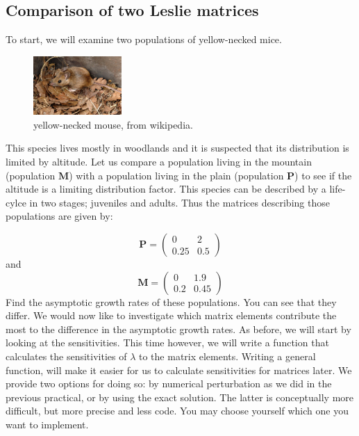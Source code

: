 \documentclass{article}\usepackage[]{graphicx}\usepackage[]{color}
\begin{document}
\subsection{Comparison of two Leslie matrices}
To start, we will examine two populations of yellow-necked mice. 

\begin{figure}[h]
\centering
\includegraphics[width=0.3\textwidth]{mouse.jpg}
\caption{\label{fig:mice}yellow-necked mouse, from wikipedia.}
\end{figure}

This species lives mostly in woodlands and it is suspected that its distribution is limited by altitude. Let us compare a population living in the mountain (population $\boldsymbol{M}$) with a population living in the plain (population $\boldsymbol{P}$) to see if the altitude is a limiting distribution factor. This species can be described by a life-cylce in two stages; juveniles and adults. Thus the matrices describing those populations are given by:

\begin{equation}
\boldsymbol{P}=\begin{pmatrix}
0&2\\
0.25&0.5
\end{pmatrix}
\end{equation}
and
\begin{equation}
\boldsymbol{M}=\begin{pmatrix}
0&1.9\\
0.2&0.45
\end{pmatrix}
\end{equation}
Find the asymptotic growth rates of these populations. You can see that they differ. We would now like to investigate which matrix elements contribute the most to the difference in the asymptotic growth rates. As before, we will start by looking at the sensitivities. This time however, we will write a function that calculates the sensitivities of $\lambda$ to the matrix elements. Writing a general function, will make it easier for us to calculate sensitivities for matrices later. We provide two options for doing so: by numerical perturbation as we did in the previous practical, or by using the exact solution. The latter is conceptually more difficult, but more precise and less code. You may choose yourself which one you want to implement.
\end{document}
